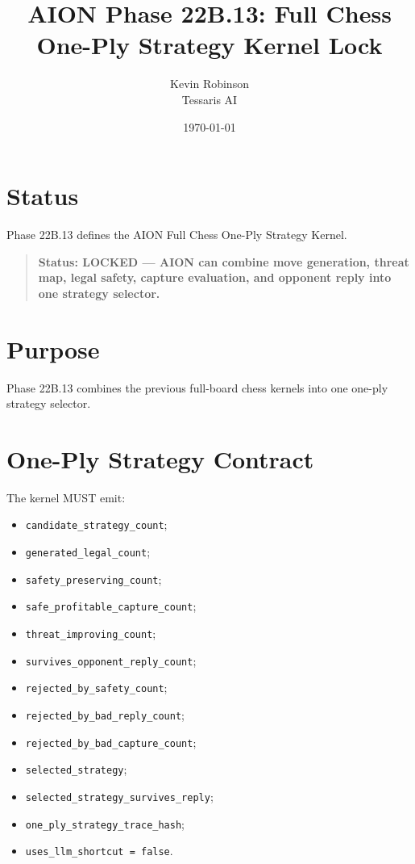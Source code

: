 \documentclass[11pt,a4paper]{article}
\title{\textbf{AION Phase 22B.13: Full Chess One-Ply Strategy Kernel Lock}}
\author{Kevin Robinson\\Tessaris AI}
\date{\today}
\begin{document}
\maketitle

\section{Status}

Phase 22B.13 defines the AION Full Chess One-Ply Strategy Kernel.

\begin{quote}
\textbf{Status: LOCKED --- AION can combine move generation, threat map, legal safety, capture evaluation, and opponent reply into one strategy selector.}
\end{quote}

\section{Purpose}

Phase 22B.13 combines the previous full-board chess kernels into one one-ply strategy selector.

\section{One-Ply Strategy Contract}

The kernel MUST emit:

\begin{itemize}
  \item \texttt{candidate\_strategy\_count};
  \item \texttt{generated\_legal\_count};
  \item \texttt{safety\_preserving\_count};
  \item \texttt{safe\_profitable\_capture\_count};
  \item \texttt{threat\_improving\_count};
  \item \texttt{survives\_opponent\_reply\_count};
  \item \texttt{rejected\_by\_safety\_count};
  \item \texttt{rejected\_by\_bad\_reply\_count};
  \item \texttt{rejected\_by\_bad\_capture\_count};
  \item \texttt{selected\_strategy};
  \item \texttt{selected\_strategy\_survives\_reply};
  \item \texttt{one\_ply\_strategy\_trace\_hash};
  \item \texttt{uses\_llm\_shortcut = false}.
\end{itemize}
\end{document}
